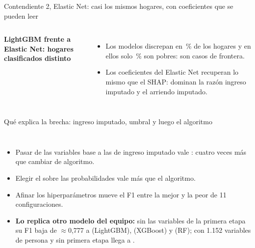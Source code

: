 \begin{frame}{Contendiente 2, Elastic Net: casi los mismos hogares, con coeficientes que se pueden leer}
  \begin{columns}[T]
    \centering\small\textbf{LightGBM frente a Elastic Net: hogares clasificados distinto}\\[2mm]
    \footnotesize
    \resizebox{\linewidth}{!}{}\\[2mm]
    \raggedright\small
    \begin{itemize}\setlength{\itemsep}{2pt}
      \item Los modelos discrepan en \nDisagreeShare{}\,\% de los hogares y en ellos solo \nDisagreePoor{}\,\% son pobres: son casos de frontera.
      \item Los coeficientes del Elastic Net recuperan lo mismo que el SHAP: dominan la razón ingreso imputado y el arriendo imputado.
    \end{itemize}
  \end{columns}
\end{frame}

\begin{frame}{Qué explica la brecha: ingreso imputado, umbral y luego el algoritmo}
  \begin{columns}[T]
    \small
    \begin{itemize}\setlength{\itemsep}{3pt}
      \item Pasar de las variables base a las de ingreso imputado vale \nGainIncome{}: cuatro veces más que cambiar de algoritmo.
      \item Elegir el  sobre las probabilidades vale más que el algoritmo.
      \item Afinar los hiperparámetros mueve el F1 \nGainHyper{} entre la mejor y la peor de 11 configuraciones.
      \item {\footnotesize\textbf{Lo replica otro modelo del equipo:} sin las variables de la primera etapa su F1 baja de $\approx$0,777 a \JhFoneLGBMsin{} (LightGBM), \JhFoneXGBsin{} (XGBoost) y \JhFoneRFsin{} (RF); con 1.152 variables de persona y sin primera etapa llega a \JhFoneLGBMmil.}
    \end{itemize}
  \end{columns}
\end{frame}

